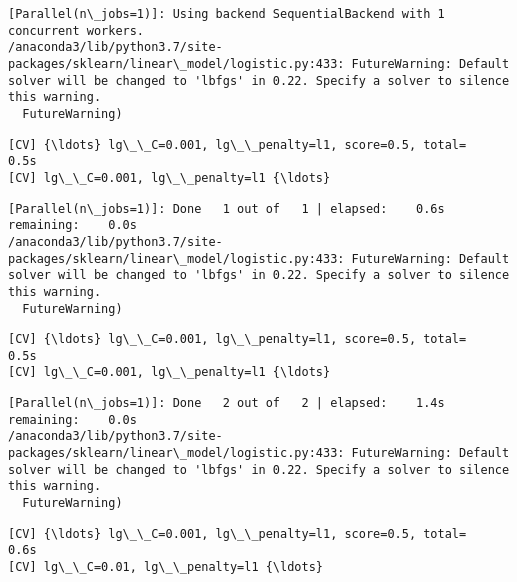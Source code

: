\documentclass[11pt]{article}
\begin{document}
    \begin{Verbatim}[commandchars=\\\{\}]
[Parallel(n\_jobs=1)]: Using backend SequentialBackend with 1 concurrent workers.
/anaconda3/lib/python3.7/site-packages/sklearn/linear\_model/logistic.py:433: FutureWarning: Default solver will be changed to 'lbfgs' in 0.22. Specify a solver to silence this warning.
  FutureWarning)

    \end{Verbatim}

    \begin{Verbatim}[commandchars=\\\{\}]
[CV] {\ldots} lg\_\_C=0.001, lg\_\_penalty=l1, score=0.5, total=   0.5s
[CV] lg\_\_C=0.001, lg\_\_penalty=l1 {\ldots}

    \end{Verbatim}

    \begin{Verbatim}[commandchars=\\\{\}]
[Parallel(n\_jobs=1)]: Done   1 out of   1 | elapsed:    0.6s remaining:    0.0s
/anaconda3/lib/python3.7/site-packages/sklearn/linear\_model/logistic.py:433: FutureWarning: Default solver will be changed to 'lbfgs' in 0.22. Specify a solver to silence this warning.
  FutureWarning)

    \end{Verbatim}

    \begin{Verbatim}[commandchars=\\\{\}]
[CV] {\ldots} lg\_\_C=0.001, lg\_\_penalty=l1, score=0.5, total=   0.5s
[CV] lg\_\_C=0.001, lg\_\_penalty=l1 {\ldots}

    \end{Verbatim}

    \begin{Verbatim}[commandchars=\\\{\}]
[Parallel(n\_jobs=1)]: Done   2 out of   2 | elapsed:    1.4s remaining:    0.0s
/anaconda3/lib/python3.7/site-packages/sklearn/linear\_model/logistic.py:433: FutureWarning: Default solver will be changed to 'lbfgs' in 0.22. Specify a solver to silence this warning.
  FutureWarning)

    \end{Verbatim}

    \begin{Verbatim}[commandchars=\\\{\}]
[CV] {\ldots} lg\_\_C=0.001, lg\_\_penalty=l1, score=0.5, total=   0.6s
[CV] lg\_\_C=0.01, lg\_\_penalty=l1 {\ldots}

    \end{Verbatim}
\end{document}
